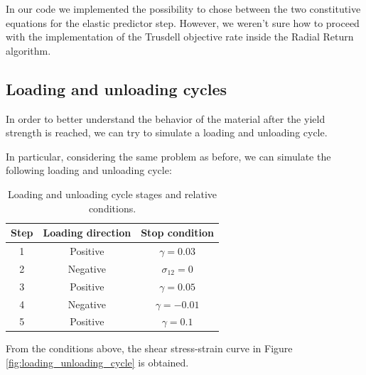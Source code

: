 In our code we implemented the possibility to chose between the two constitutive equations for the elastic predictor step.
However, we weren't sure how to proceed with the implementation of the Trusdell objective rate inside the Radial Return algorithm.


\subsection{Loading and unloading cycles}

In order to better understand the behavior of the material after the yield  strength is reached, we can try to simulate a loading and unloading cycle.

In particular, considering the same problem as before, we can simulate the following loading and unloading cycle:

\begin{table}[H]
    \centering
    \begin{tabular}{|c|c|c|}
        \hline
        \textbf{Step} & \textbf{Loading direction} & \textbf{Stop condition} \\
        \hline
        1             & Positive                   & $\gamma = 0.03$         \\
        2             & Negative                   & $\sigma_{12} = 0$       \\
        3             & Positive                   & $\gamma = 0.05$         \\
        4             & Negative                   & $\gamma = -0.01$        \\
        5             & Positive                   & $\gamma = 0.1$          \\
        \hline
    \end{tabular}
    \caption{Loading and unloading cycle stages and relative conditions.}
    \label{tab:loading_unloading_cycle}
\end{table}

From the conditions above, the shear stress-strain curve in Figure \ref{fig:loading_unloading_cycle} is obtained.

